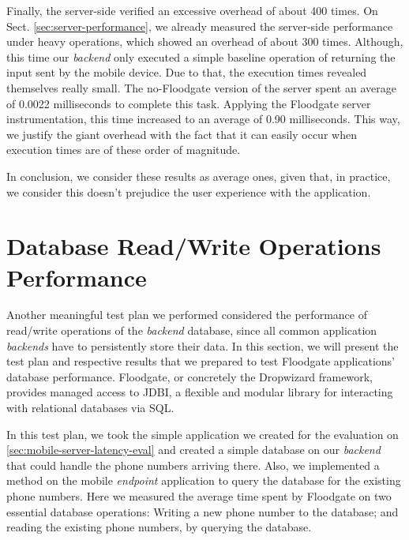 Finally, the server-side verified an excessive overhead of about 400 times. On Sect. \ref{sec:server-performance}, we already measured the server-side performance under heavy operations, which showed an overhead of about 300 times. Although, this time our \textit{backend} only executed a simple baseline operation of returning the input sent by the mobile device. Due to that, the execution times revealed themselves really small. The no-Floodgate version of the server spent an average of 0.0022 milliseconds to complete this task. Applying the Floodgate server instrumentation, this time increased to an average of 0.90 milliseconds. This way, we justify the giant overhead with the fact that it can easily occur when execution times are of these order of magnitude.

In conclusion, we consider these results as average ones, given that, in practice, we consider this doesn't prejudice the user experience with the application.

\section{Database Read/Write Operations Performance}

Another meaningful test plan we performed considered the performance of read/write operations of the \textit{backend} database, since all common application \textit{backends} have to persistently store their data. In this section, we will present the test plan and respective results that we prepared to test Floodgate applications' database performance. Floodgate, or concretely the Dropwizard framework, provides managed access to JDBI, a flexible and modular library for interacting with relational databases via SQL.

In this test plan, we took the simple application we created for the evaluation on \ref{sec:mobile-server-latency-eval} and created a simple database on our \textit{backend} that could handle the phone numbers arriving there. Also, we implemented a method on the mobile \textit{endpoint} application to query the database for the existing phone numbers. Here we measured the average time spent by Floodgate on two essential database operations: Writing a new phone number to the database; and reading the existing phone numbers, by querying the database.

